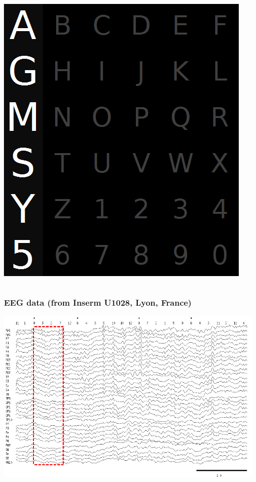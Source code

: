 \documentclass{beamer}
\begin{document}
\begin{frame}
\begin{columns}
\begin{column}{0.25\linewidth}
{				\includegraphics[width=\linewidth]{P300_grid.png}
			}
		\end{column}
	\end{columns}
\end{frame}

\begin{frame}\frametitle{EEG data (from Inserm U1028, Lyon, France)}
	\includegraphics[width=\linewidth]{EEG.png}
\end{frame}
\end{document}
